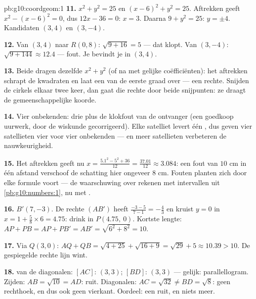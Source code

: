 \begin{solution}{pb:g10:coordgeom:1}
\textbf{11.} $x^2 + y^2 = 25$ en $(x - 6)^2 + y^2 = 25$. Aftrekken geeft
$x^2 - (x - 6)^2 = 0$, dus $12x - 36 = 0$: $x = 3$. Daarna $9 + y^2 = 25$:
$y = \pm 4$. Kandidaten $(3, 4)$ en $(3, -4)$.

\textbf{12.} Van $(3, 4)$ naar $R(0, 8)$: $\sqrt{9 + 16} = 5$ --- dat klopt.
Van $(3, -4)$: $\sqrt{9 + 144} \approx 12.4$ --- fout. Je bevindt je in
$(3, 4)$.

\textbf{13.} Beide  dragen dezelfde $x^2 + y^2$ (of na
 met gelijke coëfficiënten): het aftrekken schrapt de kwadraten en
laat een  van de eerste graad over --- een rechte. Snijden de
cirkels elkaar twee keer, dan gaat die rechte door beide snijpunten: ze
draagt de gemeenschappelijke koorde.

\textbf{14.} Vier onbekenden: drie  plus de klokfout van de
ontvanger (een goedkoop uurwerk, door de wiskunde gecorrigeerd). Elke
satelliet levert één , dus geven vier satellieten vier
 voor vier onbekenden --- en meer satellieten verbeteren de
nauwkeurigheid.

\textbf{15.} Het aftrekken geeft nu
$x = \frac{5.1^2 - 5^2 + 36}{12} = \frac{37.01}{12} \approx 3.084$: een fout
van $10$ cm in één afstand verschoof de schatting hier ongeveer $8$ cm.
Fouten planten zich door elke formule voort --- de waarschuwing over rekenen
met intervallen uit \cref{pb:g10:numbers:1}, nu met .

\textbf{16.} $B'(7, -3)$. De rechte $(AB')$ heeft 
$\frac{-3 - 5}{7 - 1} = -\frac43$ en kruist $y = 0$ in
$x = 1 + \frac{5}{8} \times 6 = 4.75$: drink in $P(4.75,\ 0)$. Kortste
lengte: $AP + PB = AP + PB' = AB' = \sqrt{6^2 + 8^2} = 10$.

\textbf{17.} Via $Q(3, 0)$: $AQ + QB = \sqrt{4 + 25} + \sqrt{16 + 9} =
\sqrt{29} + 5 \approx 10.39 > 10$. De gespiegelde rechte lijn wint.

\textbf{18.}  van de diagonalen: $[AC]$: $(3, 3)$; $[BD]$: $(3, 3)$
--- gelijk: parallellogram. Zijden: $AB = \sqrt{10} = AD$: ruit.
Diagonalen: $AC = \sqrt{32} \neq BD = \sqrt{8}$: geen rechthoek, en dus ook
geen vierkant. Oordeel: een ruit, en niets meer.


\end{solution}
